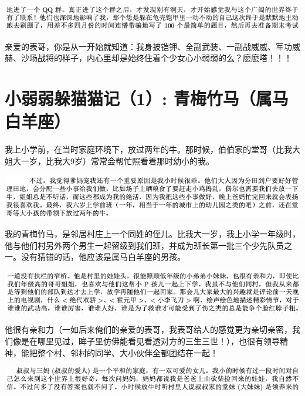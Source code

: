 \documentclass[9pt, b5paper]{article}
\begin{document}
\begin{center}
\includegraphics[width=.9\linewidth]{./pic/backups_plans_20210421_095520.png}
\end{center}

亲爱的表哥，你是从一开始就知道：我身披铠钾、全副武装、一副战威威、军功威赫、沙场战将的样子，内心里却是始终住着个少女心小弱弱的么？麽麽嗒！！！

\section{小弱弱躲猫猫记（1）: 青梅竹马（属马白羊座）}
\label{sec:org5d6e757}

我上小学前，在当时家庭环境下，放过两年的牛。那时候，伯伯家的堂哥（比我大姐大一岁，比我大9岁）常常会帮忙照看着那时幼小的我。

\begin{center}
\includegraphics[width=.9\linewidth]{./pic/backups_plans_20210422_095907.png}
\end{center}

我的青梅竹马，是邻居村庄上一个同姓的侄儿。比我大一岁，我上小学一年级时，他与他们村另外两个男生一起留级到我们班，并成为班长第一批三个少先队员之一。没有猜错的话，他应该是属马白羊座的男孩。

\begin{center}
\includegraphics[width=.9\linewidth]{./pic/backups_plans_20210422_074655.png}
\end{center}

他很有亲和力（一如后来俺们的亲爱的表哥，我表哥给人的感觉更为亲切亲密，我们像是在哪里见过，眸子里仿佛能看见看透对方的三生三世！），也很有领导精神，能把整个村、邻村的同学、大小伙伴全都团结在一起！

\begin{center}
\includegraphics[width=.9\linewidth]{./pic/backups_plans_20210422_094617.png}
\end{center}
\end{document}
